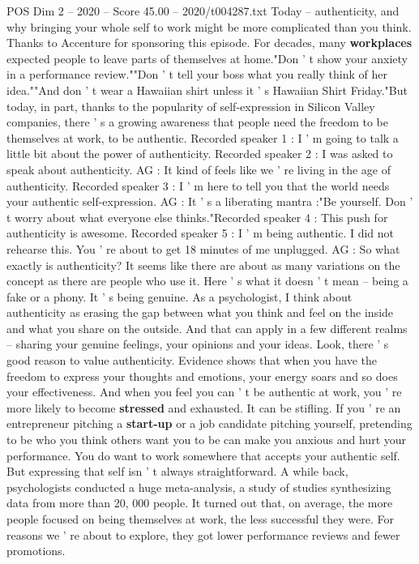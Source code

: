 \begin{textsample}{POS Dim 2 – 2020 – Score 45.00 – 2020/t004287.txt}
Today -- authenticity, and why bringing your whole self to work might be more complicated than you think.
Thanks to Accenture for sponsoring this episode.
For decades, many \textbf{workplaces} expected people to leave parts of themselves at home."Don ' t show your anxiety in a performance review.""Don ' t tell your boss what you really think of her idea.""And don ' t wear a Hawaiian shirt unless it ' s Hawaiian Shirt Friday."But today, in part, thanks to the popularity of self-expression in Silicon Valley companies, there ' s a growing awareness that people need the freedom to be themselves at work, to be authentic.
Recorded speaker 1 : I ' m going to talk a little bit about the power of authenticity.
Recorded speaker 2 : I was asked to speak about authenticity.
AG : It kind of feels like we ' re living in the age of authenticity.
Recorded speaker 3 : I ' m here to tell you that the world needs your authentic self-expression.
AG : It ' s a liberating mantra :"Be yourself.
Don ' t worry about what everyone else thinks."Recorded speaker 4 : This push for authenticity is awesome.
Recorded speaker 5 : I ' m being authentic.
I did not rehearse this.
You ' re about to get 18 minutes of me unplugged.
AG : So what exactly is authenticity?
It seems like there are about as many variations on the concept as there are people who use it.
Here ' s what it doesn ' t mean -- being a fake or a phony.
It ' s being genuine.
As a psychologist, I think about authenticity as erasing the gap between what you think and feel on the inside and what you share on the outside.
And that can apply in a few different realms -- sharing your genuine feelings, your opinions and your ideas.
Look, there ' s good reason to value authenticity.
Evidence shows that when you have the freedom to express your thoughts and emotions, your energy soars and so does your effectiveness.
And when you feel you can ' t be authentic at work, you ' re more likely to become \textbf{stressed} and exhausted.
It can be stifling.
If you ' re an entrepreneur pitching a \textbf{start-up} or a job candidate pitching yourself, pretending to be who you think others want you to be can make you anxious and hurt your performance.
You do want to work somewhere that accepts your authentic self.
But expressing that self isn ' t always straightforward.
A while back, psychologists conducted a huge meta-analysis, a study of studies synthesizing data from more than 20, 000 people.
It turned out that, on average, the more people focused on being themselves at work, the less successful they were.
For reasons we ' re about to explore, they got lower performance reviews and fewer promotions.

\end{textsample}
